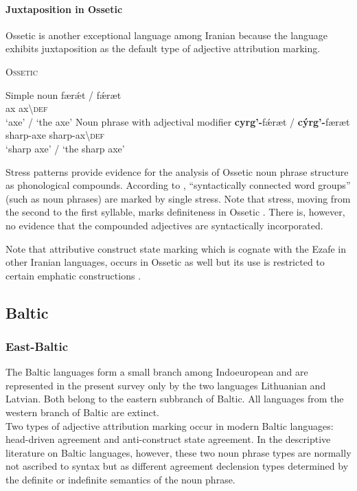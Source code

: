 \paragraph{Juxtaposition in Ossetic}
Ossetic is another exceptional language among Iranian because the language exhibits juxtaposition as the default type of adjective attribution marking.
\newpage
\begin{exe}
\ex \textsc{Ossetic} \cite[12]{abaev1964} \label{ossetic attrcomp}
\begin{xlist}
\ex	Simple noun
\gll	færǽt / fǽræt\\
	ax { } ax\textbackslash\textsc{def}\\
\glt	‘axe’ / ‘the axe’
\ex	Noun phrase with adjectival modifier
\gll	\textbf{cyrg'-}fǽræt / \textbf{cýrg'-}færæt\\
	sharp-axe { } sharp-ax\textbackslash\textsc{def}\\
\glt	‘sharp axe’ / ‘the sharp axe’
\end{xlist}
\end{exe}
Stress patterns provide evidence for the analysis of Ossetic noun phrase structure as phonological compounds. According to \citet[10]{abaev1964}, “syntactically connected word groups” (such as noun phrases) are marked by single stress. Note that stress, moving from the second to the first syllable, marks definiteness in Ossetic \citep[12]{abaev1964}. There is, however, no evidence that the compounded adjectives are syntactically incorporated.

Note that attributive construct state marking which is cognate with the Ezafe in other Iranian languages, occurs in Ossetic as well but its use is restricted to certain emphatic constructions \cite[467]{thodarson1989}.

\subsection{Baltic} \label{baltic synchr}
\subsubsection{East-Baltic}
The Baltic languages form a small branch among Indoeuropean and are represented in the present survey only by the two languages Lithuanian and Latvian. Both belong to the eastern subbranch of Baltic. All languages from the western branch of Baltic are extinct.\\

\noindent Two types of adjective attribution marking occur in modern Baltic languages: head-driven agreement and anti-construct state agreement. In the descriptive literature on Baltic languages, however, these two noun phrase types are normally not ascribed to syntax but as different agreement declension types determined by the definite or indefinite semantics of the noun phrase.

